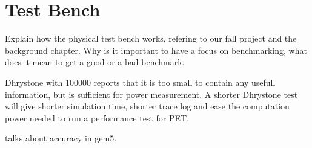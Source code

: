 \section{Test Bench}
Explain how the physical test bench works, refering to our fall project and the
background chapter. Why is it important to have a focus on benchmarking, what
does it mean to get a good or a bad benchmark.

Dhrystone with 100000 reports that it is too small to contain any usefull information, but is sufficient for power measurement.
A shorter Dhrystone test will give shorter simulation time, shorter trace log and ease the computation power needed to run
a performance test for PET.

\cite{butko2012accuracy,pusdesrissources} talks about accuracy in gem5.

